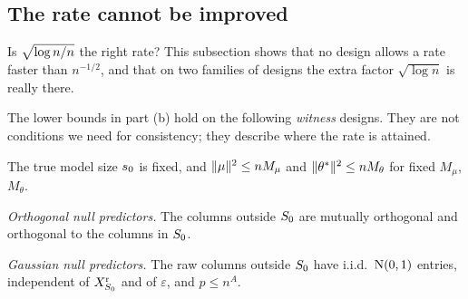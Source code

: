 \subsection{The rate cannot be improved}\label{sec:sharp}

Is $\sqrt{\log n/n}$ the right rate? This subsection shows that no design allows a rate faster than $n^{-1/2}$, and that on two
families of designs the extra factor $\sqrt{\log n}$ is really there.


The lower bounds in part (b) hold on the following \emph{witness} designs. They are not conditions we need for
consistency; they describe where the rate is attained.

\begin{localassumption}\label{asm:witness}
\begin{asmitems}
  \item\label{asm:witness-energy} The true model size $s_0$ is fixed, and $\lVert \mu\rVert^2\le nM_\mu$ and
    $\lVert \theta^*\rVert^2\le nM_\theta$ for fixed $M_\mu$, $M_\theta$.
  \item\label{asm:witness-orth} \emph{Orthogonal null predictors.} The columns outside $S_0$ are mutually orthogonal
    and orthogonal to the columns in $S_0$.
  \item\label{asm:witness-gauss} \emph{Gaussian null predictors.} The raw columns outside $S_0$ have i.i.d.\ $\mathrm{N}(0,1)$
    entries, independent of $X^{\mathrm r}_{S_0}$ and of $\varepsilon$, and $p\le n^A$.
\end{asmitems}
\end{localassumption}

